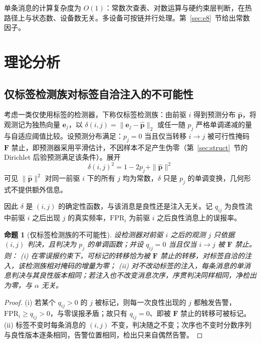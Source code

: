 \documentclass[manuscript,screen,review]{acmart}
\newtheorem{proposition}[theorem]{命题}%
\begin{document}
单条消息的计算复杂度为 $O(1)$：常数次查表、对数运算与硬约束层判断，在热路径上与状态数、设备数无关。多设备可按链并行处理。第~\ref{sec:e8}~节给出常数因子。

\section{理论分析}
\label{sec:theory}

\subsection{仅标签检测族对标签自洽注入的不可能性}
\label{sec:ta}

考虑一类仅使用标签的检测器，下称仅标签检测族：由前驱 $i$ 得到预测分布 $\hat{\mathbf p}$，将观测记为独热向量 $\mathbf e_j$，以 $\delta(i,j)=\|\mathbf e_j-\hat{\mathbf p}\|_2$ 或任一随 $p_j$ 严格单调递减的量与自适应阈值比较。设预测分布满足：$p_j=0$ 当且仅当转移 $i\to j$ 被可行性掩码 $\mathbf F$ 禁止，即预测器采用平滑估计，不因样本不足产生伪零（第~\ref{sec:struct}~节的 {Dirichlet} 后验预测满足该条件）。展开
\begin{equation}
  \delta(i,j)^2=1-2p_j+\|\hat{\mathbf p}\|^2
\end{equation}
可见 $\|\hat{\mathbf p}\|^2$ 对同一前驱 $i$ 下的所有 $j$ 均为常数，$\delta$ 只是 $p_j$ 的单调变换，几何形式不提供额外信息。

因此 $\delta$ 是 $(i,j)$ 的确定性函数，与该消息是良性还是注入无关。记 $q_{ij}$ 为良性流中前驱 $i$ 之后出现 $j$ 的真实频率，$\mathrm{FPR}_i$ 为前驱 $i$ 之后良性消息上的误报率。

\begin{proposition}[仅标签检测族的不可能性]
\label{prop:ta}
设检测器对前驱 $i$ 之后的观测 $j$ 只依据 $(i,j)$ 判决，且判决为 $p_j$ 的单调函数；并设 $q_{ij}=0$ 当且仅当 $i\to j$ 被 $\mathbf F$ 禁止。则：
(i) 在零误报约束下，可标记的转移恰为被 $\mathbf F$ 禁止的转移，对标签自洽的注入，该检测族相对掩码的增量为零；
(ii) 对不改动标签的注入，每条消息的单消息判决与其良性版本相同；若注入也不改变消息次序，序贯判决同样相同，净检出为零，与 $\alpha$ 无关。
\end{proposition}

\begin{proof}
(i) 若某个 $q_{ij}>0$ 的 $j$ 被标记，则每一次良性出现的 $j$ 都触发告警，$\mathrm{FPR}_i\ge q_{ij}>0$，与零误报矛盾；故只有 $q_{ij}=0$、即被 $\mathbf F$ 禁止的转移可被标记。(ii) 标签不变时每条消息的 $(i,j)$ 不变，判决随之不变；次序也不变时分数序列与良性版本逐条相同，告警位置相同，检出只来自偶然告警。
\end{proof}
\end{document}
